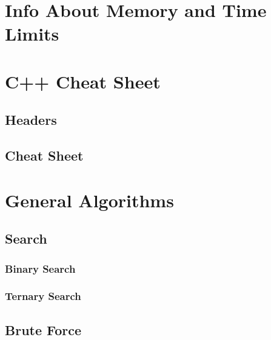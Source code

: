 \documentclass[10pt,landscape,twocolumn,notitlepage]{article}
\makeatletter
\let\org@subfile%
\renewcommand*{}[1]{%
  \filename@parse{#1}%
  \expandafter
  \graphicspath\expandafter{\expandafter{\filename@area}}%
  \expandafter
  \lstset\expandafter{inputpath={\expandafter\filename@area}}
  \org@subfile{#1}%
  \lstset{inputpath=\currfiledir}
}
\makeatother
\begin{document}
\def\title{Nicholas Mc-Donnell's ICPC Notes}
\tableofcontents\newpage

\section{Info About Memory and Time Limits}


\section{C++ Cheat Sheet}
\subsection{Headers}


\subsection{Cheat Sheet}



\section{General Algorithms}
\subsection{Search}
\subsubsection{Binary Search}


\subsubsection{Ternary Search}


\subsection{Brute Force}












\end{document}
